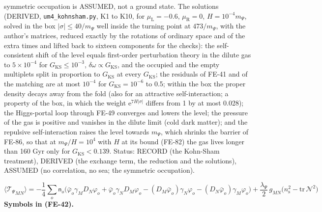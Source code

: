 \documentclass[
  10pt,
]{article}
\begin{document}
symmetric occupation is ASSUMED, not a ground state. The solutions
(DERIVED, \texttt{um4\_kohnsham.py}, K1 to K10, for
\(\mu_{\mathrm{L}} = -0.6\), \(\mu_{\mathrm{R}} = 0\),
\(H = 10^{-4}m_\Psi\), solved in the box
\(\lvert\sigma\rvert \le 40/m_\Psi\) well inside the turning point at
\(473/m_\Psi\), with the author's matrices, reduced exactly by the
rotations of ordinary space and of the extra times and lifted back to
sixteen components for the checks): the self-consistent shift of the
level equals first-order perturbation theory in the dilute gas to
\(5\times10^{-4}\) for \(G_{\mathrm{KS}} \le 10^{-3}\),
\(\delta\omega \propto G_{\mathrm{KS}}\), and the occupied and the empty
multiplets split in proportion to \(G_{\mathrm{KS}}\) at every
\(G_{\mathrm{KS}}\); the residuals of FE-41 and of the matching are at
most \(10^{-4}\) for \(G_{\mathrm{KS}} = 10^{-6}\) to 0.5; within the
box the proper density decays away from the fold (also for an attractive
self-interaction; a property of the box, in which the weight
\(\mathrm{e}^{7H\lvert\sigma\rvert}\) differs from 1 by at most 0.028);
the Higgs-portal loop through FE-49 converges and lowers the level; the
pressure of the gas is positive and vanishes in the dilute limit (cold
dark matter); and the repulsive self-interaction raises the level
towards \(m_\Psi\), which shrinks the barrier of FE-86, so that at
\(m_\Psi/H = 10^4\) with \(H\) at its bound (FE-82) the gas lives longer
than 160 Gyr only for \(G_{\mathrm{KS}} < 0.139\). Status: RECORD (the
Kohn-Sham treatment), DERIVED (the exchange term, the reduction and the
solutions), ASSUMED (no correlation, no sea; the symmetric occupation).

\[
\langle{\mathcal{T}_\Psi}_{MN}\rangle = -\frac14\sum_o\mathsf{n}_o\Big(\bar\varphi_o\gamma_MD_N\varphi_o + \bar\varphi_o\gamma_ND_M\varphi_o
 - (D_M\bar\varphi_o)\gamma_N\varphi_o - (D_N\bar\varphi_o)\gamma_M\varphi_o\Big) + \frac{\lambda_\Psi}{2}\,g_{MN}\big(n_{\mathrm{s}}^2 - \mathrm{tr}\,\mathcal{N}^2\big) \tag{FE-42}
\] \textbf{Symbols in (FE-42).}
\end{document}
